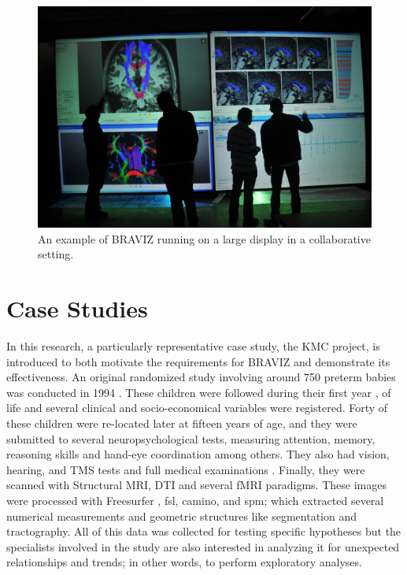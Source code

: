 \documentclass[twocolumn]{svjour3}
\begin{document}
\begin{figure}
\begin{center}
\includegraphics[width=\linewidth]{figures/imagine.jpg}
\end{center}
 \caption{\label{fig_imagine} An example of BRAVIZ running on a large display in a collaborative setting.}
\end{figure}

\section{Case Studies}

In this research, a particularly representative case study, the KMC project, is introduced to both motivate the requirements for BRAVIZ and demonstrate its effectiveness. An original randomized study involving around 750 preterm babies was conducted in 1994 \cite{charpak_kangaroo_1997}. These children were followed during their first year \cite{charpak_randomized_2001}, \cite{tessier_kangaroo_2009} of life and several clinical and socio-economical variables were registered. Forty of these children were re-located later at fifteen years of age, and they were submitted to several neuropsychological tests, measuring attention, memory, reasoning skills and hand-eye coordination among others. They also had vision, hearing, and TMS tests\cite{schneider_cerebral_2012} and full medical examinations . Finally, they were scanned with Structural MRI, DTI and several fMRI paradigms. These images were processed with Freesurfer \cite{fischl_freesurfer_2012}, fsl\cite{jenkinson_fsl_2012}, camino\cite{cook_camino:_2006}, and spm\cite{friston_statistical_2006}; which extracted several numerical measurements and geometric structures like segmentation and tractography. All of this data was collected for testing specific hypotheses but the specialists involved in the study are also interested in analyzing it for unexpected relationships and trends; in other words, to perform exploratory analyses.
\end{document}
